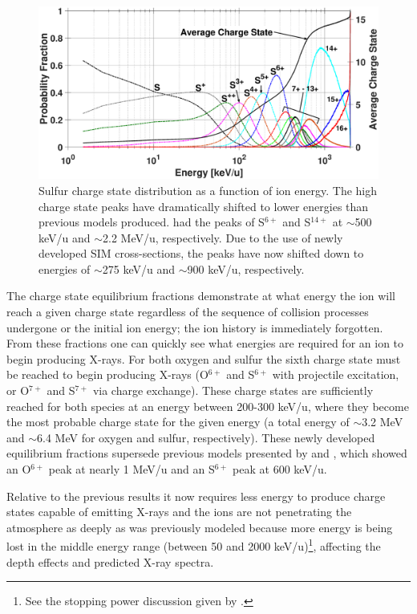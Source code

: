 \documentclass[draft]{agujournal2018}
\begin{document}
\begin{figure}[ht]
    \centering
    \includegraphics[width=\textwidth]{Figures/CSDsul.eps}
    \caption{Sulfur charge state distribution as a function of ion energy. The high charge state peaks have dramatically shifted to lower energies than previous models produced. \citet{ozak2010} had the peaks of S$^{6+}$ and S$^{14+}$ at $\sim$500 keV/u and $\sim$2.2 MeV/u, respectively. Due to the use of newly developed SIM cross-sections, the peaks have now shifted down to energies of $\sim$275 keV/u and $\sim$900 keV/u, respectively.}
    \label{fig:CSDsul}
\end{figure}

The charge state equilibrium fractions demonstrate at what energy the ion will reach a given charge state regardless of the sequence of collision processes undergone or the initial ion energy; the ion history is immediately forgotten.
From these fractions one can quickly see what energies are required for an ion to begin producing X-rays.
For both oxygen and sulfur the sixth charge state must be reached to begin producing X-rays (O$^{6+}$ and S$^{6+}$ with projectile excitation, or O$^{7+}$ and S$^{7+}$ via charge exchange).
These charge states are sufficiently reached for both species at an energy between 200-300 keV/u, where they become the most probable charge state for the given energy (a total energy of $\sim$3.2 MeV and $\sim$6.4 MeV for oxygen and sulfur, respectively).
These newly developed equilibrium fractions supersede previous models presented by \citet{ozak2010} and \citet{houston2018}, which showed an O$^{6+}$ peak at nearly 1 MeV/u and an S$^{6+}$ peak at 600 keV/u.

Relative to the previous results it now requires less energy to produce charge states capable of emitting X-rays and the ions are not penetrating the atmosphere as deeply as was previously modeled because more energy is being lost in the middle energy range (between 50 and 2000 keV/u)\footnote{See the stopping power discussion given by \citet{schultz2019}.}, affecting the depth effects and predicted X-ray spectra.
\end{document}
